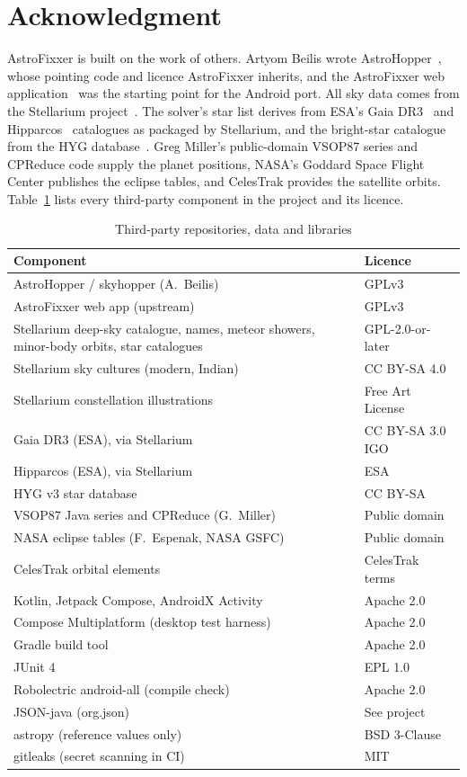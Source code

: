 \section*{Acknowledgment}

AstroFixxer is built on the work of others. Artyom Beilis wrote AstroHopper~\cite{astrohopper}, whose pointing code and licence AstroFixxer inherits, and the AstroFixxer web application~\cite{astrofixxerweb} was the starting point for the Android port. All sky data comes from the Stellarium project~\cite{zotti2021}. The solver's star list derives from ESA's Gaia DR3~\cite{gaia2023} and Hipparcos~\cite{perryman1997} catalogues as packaged by Stellarium, and the bright-star catalogue from the HYG database~\cite{hyg}. Greg Miller's public-domain VSOP87 series and CPReduce code supply the planet positions, NASA's Goddard Space Flight Center publishes the eclipse tables, and CelesTrak provides the satellite orbits. Table~\ref{tab:credits} lists every third-party component in the project and its licence.

\begin{table}[h]
\centering
\caption{Third-party repositories, data and libraries}
\label{tab:credits}
\small
\begin{tabular}{@{}p{} p{}@{}}
\toprule
Component & Licence \\
\midrule
AstroHopper / skyhopper (A.~Beilis) & GPLv3 \\
AstroFixxer web app (upstream) & GPLv3 \\
Stellarium deep-sky catalogue, names, meteor showers, minor-body orbits, star catalogues & GPL-2.0-or-later \\
Stellarium sky cultures (modern, Indian) & CC BY-SA 4.0 \\
Stellarium constellation illustrations & Free Art License \\
Gaia DR3 (ESA), via Stellarium & CC BY-SA 3.0 IGO \\
Hipparcos (ESA), via Stellarium & ESA \\
HYG v3 star database & CC BY-SA \\
VSOP87 Java series and CPReduce (G.~Miller) & Public domain \\
NASA eclipse tables (F.~Espenak, NASA GSFC) & Public domain \\
CelesTrak orbital elements & CelesTrak terms \\
Kotlin, Jetpack Compose, AndroidX Activity & Apache 2.0 \\
Compose Multiplatform (desktop test harness) & Apache 2.0 \\
Gradle build tool & Apache 2.0 \\
JUnit 4 & EPL 1.0 \\
Robolectric android-all (compile check) & Apache 2.0 \\
JSON-java (org.json) & See project \\
astropy (reference values only)~\cite{astropy2022} & BSD 3-Clause \\
gitleaks (secret scanning in CI) & MIT \\
\bottomrule
\end{tabular}
\end{table}
